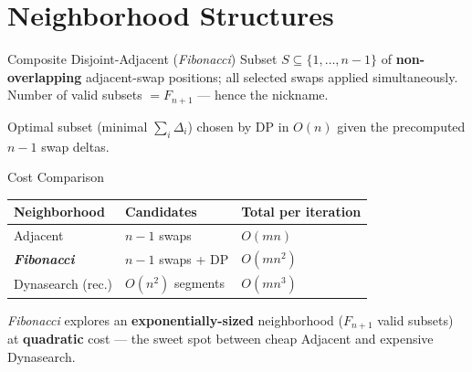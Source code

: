 \documentclass[aspectratio=169]{beamer}
\begin{document}
\section{Neighborhood Structures}
\begin{frame}{Composite Disjoint-Adjacent (\emph{Fibonacci})}
    Subset $S \subseteq \{1,\dots,n{-}1\}$ of \textbf{non-overlapping} adjacent-swap positions; all selected swaps applied simultaneously. Number of valid subsets $= F_{n+1}$ --- hence the nickname.

    \vspace{0.3cm}
    \begin{center}
    \end{center}

    \vspace{0.2cm}
    Optimal subset (minimal $\sum_i \Delta_i$) chosen by DP in $O(n)$ given the precomputed $n{-}1$ swap deltas.
\end{frame}

\begin{frame}{Cost Comparison}
    \begin{center}
    \begin{tabular}{lll}
        \toprule
        Neighborhood & Candidates & Total per iteration \\
        \midrule
        Adjacent             & $n-1$ swaps        & $O(mn)$ \\
        \textbf{\emph{Fibonacci}} & $n-1$ swaps + DP   & $O(mn^2)$ \\
        Dynasearch (rec.)    & $O(n^2)$ segments  & $O(mn^3)$ \\
        \bottomrule
    \end{tabular}
    \end{center}

    \vspace{0.5cm}
    \emph{Fibonacci} explores an \textbf{exponentially-sized} neighborhood ($F_{n+1}$ valid subsets) at \textbf{quadratic} cost --- the sweet spot between cheap Adjacent and expensive Dynasearch.
\end{frame}
\end{document}
